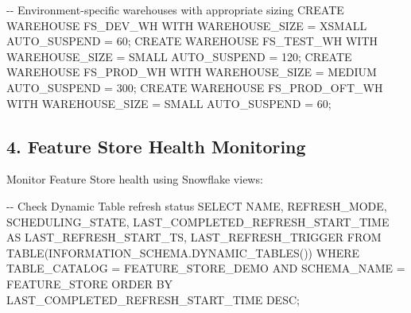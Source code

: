 \documentclass[
  letterpaper,
  DIV=11,
  numbers=noendperiod]{scrreprt}
\newenvironment{Shaded}{\begin{snugshade}}{\end{snugshade}}
\newcommand{\CommentTok}[1]{\textcolor[rgb]{0.37,0.37,0.37}{#1}}
\newcommand{\DecValTok}[1]{\textcolor[rgb]{0.68,0.00,0.00}{#1}}
\newcommand{\KeywordTok}[1]{\textcolor[rgb]{0.00,0.23,0.31}{#1}}
\newcommand{\NormalTok}[1]{\textcolor[rgb]{0.00,0.23,0.31}{#1}}
\newcommand{\OperatorTok}[1]{\textcolor[rgb]{0.37,0.37,0.37}{#1}}
\newcommand{\StringTok}[1]{\textcolor[rgb]{0.13,0.47,0.30}{#1}}
\begin{document}
\begin{Shaded}
\begin{Highlighting}[]
\CommentTok{{-}{-} Environment{-}specific warehouses with appropriate sizing}
\KeywordTok{CREATE}\NormalTok{ WAREHOUSE FS\_DEV\_WH      }\KeywordTok{WITH}\NormalTok{ WAREHOUSE\_SIZE }\OperatorTok{=} \StringTok{\textquotesingle{}XSMALL\textquotesingle{}}\NormalTok{ AUTO\_SUSPEND }\OperatorTok{=} \DecValTok{60}\NormalTok{;}
\KeywordTok{CREATE}\NormalTok{ WAREHOUSE FS\_TEST\_WH     }\KeywordTok{WITH}\NormalTok{ WAREHOUSE\_SIZE }\OperatorTok{=} \StringTok{\textquotesingle{}SMALL\textquotesingle{}}\NormalTok{  AUTO\_SUSPEND }\OperatorTok{=} \DecValTok{120}\NormalTok{;}
\KeywordTok{CREATE}\NormalTok{ WAREHOUSE FS\_PROD\_WH     }\KeywordTok{WITH}\NormalTok{ WAREHOUSE\_SIZE }\OperatorTok{=} \StringTok{\textquotesingle{}MEDIUM\textquotesingle{}}\NormalTok{ AUTO\_SUSPEND }\OperatorTok{=} \DecValTok{300}\NormalTok{;}
\KeywordTok{CREATE}\NormalTok{ WAREHOUSE FS\_PROD\_OFT\_WH }\KeywordTok{WITH}\NormalTok{ WAREHOUSE\_SIZE }\OperatorTok{=} \StringTok{\textquotesingle{}SMALL\textquotesingle{}}\NormalTok{ AUTO\_SUSPEND }\OperatorTok{=} \DecValTok{60}\NormalTok{;}
\end{Highlighting}
\end{Shaded}

\hypertarget{feature-store-health-monitoring}{%
\subsection{4. Feature Store Health
Monitoring}\label{feature-store-health-monitoring}}

Monitor Feature Store health using Snowflake views:

\begin{Shaded}
\begin{Highlighting}[]
\CommentTok{{-}{-} Check Dynamic Table refresh status}
\KeywordTok{SELECT} 
\NormalTok{    NAME,}
\NormalTok{    REFRESH\_MODE,}
\NormalTok{    SCHEDULING\_STATE,}
\NormalTok{    LAST\_COMPLETED\_REFRESH\_START\_TIME }\KeywordTok{AS}\NormalTok{ LAST\_REFRESH\_START\_TS,}
\NormalTok{    LAST\_REFRESH\_TRIGGER}
\KeywordTok{FROM} \KeywordTok{TABLE}\NormalTok{(INFORMATION\_SCHEMA.DYNAMIC\_TABLES())}
\KeywordTok{WHERE}\NormalTok{ TABLE\_CATALOG }\OperatorTok{=} \StringTok{\textquotesingle{}FEATURE\_STORE\_DEMO\textquotesingle{}}
  \KeywordTok{AND}\NormalTok{ SCHEMA\_NAME }\OperatorTok{=} \StringTok{\textquotesingle{}FEATURE\_STORE\textquotesingle{}}
\KeywordTok{ORDER} \KeywordTok{BY}\NormalTok{ LAST\_COMPLETED\_REFRESH\_START\_TIME }\KeywordTok{DESC}\NormalTok{;}
\end{Highlighting}
\end{Shaded}
\end{document}
